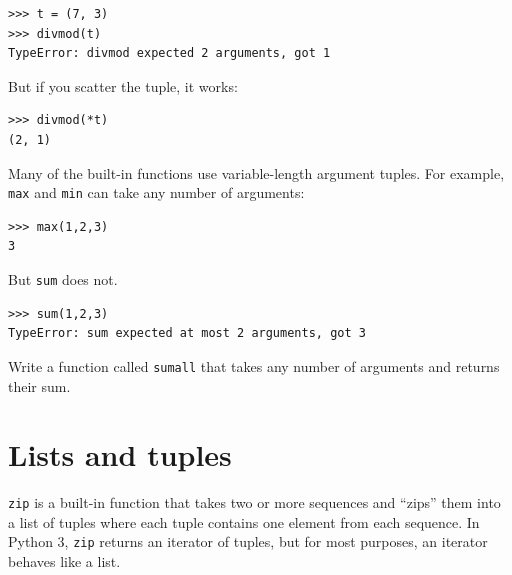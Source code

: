 \documentclass[10pt]{book}
\begin{document}
\begin{CJK}{UTF8}{gbsn}

%

\begin{verbatim}
>>> t = (7, 3)
>>> divmod(t)
TypeError: divmod expected 2 arguments, got 1
\end{verbatim}
%
But if you scatter the tuple, it works:

\begin{verbatim}
>>> divmod(*t)
(2, 1)
\end{verbatim}
%
\begin{exercise}

Many of the built-in functions use
variable-length argument tuples.  For example, {\tt max}
and {\tt min} can take any number of arguments:

\begin{verbatim}
>>> max(1,2,3)
3
\end{verbatim}
%
But {\tt sum} does not.

\begin{verbatim}
>>> sum(1,2,3)
TypeError: sum expected at most 2 arguments, got 3
\end{verbatim}
%
Write a function called {\tt sumall} that takes any number
of arguments and returns their sum.

\end{exercise}


\section{Lists and tuples}

{\tt zip} is a built-in function that takes two or more sequences and
``zips'' them into a list of tuples where each tuple contains one
element from each sequence.  In Python 3, {\tt zip} returns an iterator
of tuples, but for most purposes, an iterator behaves like a list.


\end{CJK}
\end{document}
